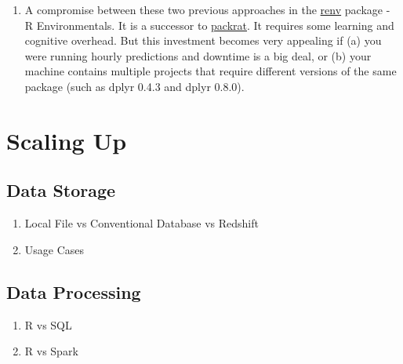 \documentclass[
]{book}
\providecommand{\tightlist}{%
  \setlength{\itemsep}{0pt}\setlength{\parskip}{0pt}}
\begin{document}
\begin{enumerate}
  A second important downside is that this approach can lock all the user's projects to specific outdated package version.

  We and others\footnote{\href{https://insightindustry.com/}{Chris Modzelewski}} advocate this approach when your team is experienced with only R, and has a machine dedicated to an important line-of-business workflow.

  When uptime is important and your team is experienced with other languages like Java, Python, or C\#, consider if those would be better suited.
\item
  A compromise between these two previous approaches in the \href{https://rstudio.github.io/renv}{renv} package - R Environmentals. It is a successor to \href{https://rstudio.github.io/packrat/}{packrat}. It requires some learning and cognitive overhead. But this investment becomes very appealing if (a) you were running hourly predictions and downtime is a big deal, or (b) your machine contains multiple projects that require different versions of the same package (such as dplyr 0.4.3 and dplyr 0.8.0).
\end{enumerate}

\hypertarget{scaling-up}{%
\chapter{Scaling Up}\label{scaling-up}}

\hypertarget{data-storage}{%
\section{Data Storage}\label{data-storage}}

\begin{enumerate}
\def\labelenumi{\arabic{enumi}.}
\tightlist
\item
  Local File vs Conventional Database vs Redshift
\item
  Usage Cases
\end{enumerate}

\hypertarget{data-processing}{%
\section{Data Processing}\label{data-processing}}

\begin{enumerate}
\def\labelenumi{\arabic{enumi}.}
\tightlist
\item
  R vs SQL
\item
  R vs Spark
\end{enumerate}
\end{document}
